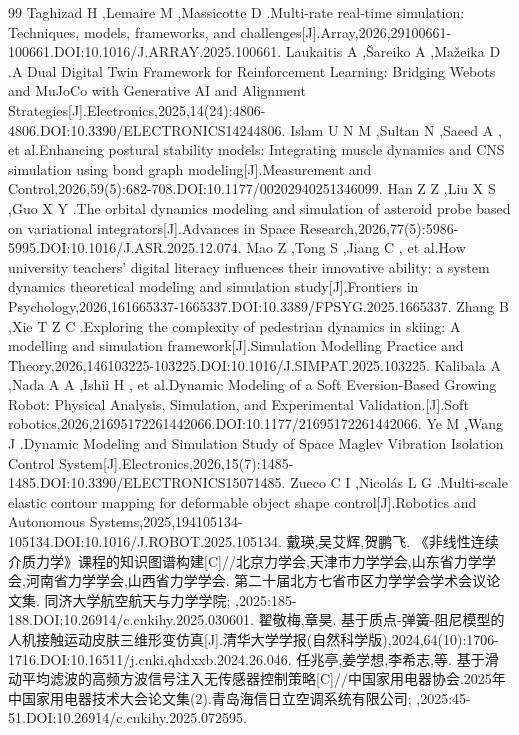\begin{thebibliography}{99}
 Taghizad H ,Lemaire M ,Massicotte D .Multi-rate real-time simulation: Techniques, models, frameworks, and challenges[J].Array,2026,29100661-100661.DOI:10.1016/J.ARRAY.2025.100661.
 Laukaitis A ,Šareiko A ,Mažeika D .A Dual Digital Twin Framework for Reinforcement Learning: Bridging Webots and MuJoCo with Generative AI and Alignment Strategies[J].Electronics,2025,14(24):4806-4806.DOI:10.3390/ELECTRONICS14244806.
 Islam U N M ,Sultan N ,Saeed A , et al.Enhancing postural stability models: Integrating muscle dynamics and CNS simulation using bond graph modeling[J].Measurement and Control,2026,59(5):682-708.DOI:10.1177/00202940251346099.
 Han Z Z ,Liu X S ,Guo X Y .The orbital dynamics modeling and simulation of asteroid probe based on variational integrators[J].Advances in Space Research,2026,77(5):5986-5995.DOI:10.1016/J.ASR.2025.12.074.
 Mao Z ,Tong S ,Jiang C , et al.How university teachers’ digital literacy influences their innovative ability: a system dynamics theoretical modeling and simulation study[J].Frontiers in Psychology,2026,161665337-1665337.DOI:10.3389/FPSYG.2025.1665337.
 Zhang B ,Xie T Z C .Exploring the complexity of pedestrian dynamics in skiing: A modelling and simulation framework[J].Simulation Modelling Practice and Theory,2026,146103225-103225.DOI:10.1016/J.SIMPAT.2025.103225.
 Kalibala A ,Nada A A ,Ishii H , et al.Dynamic Modeling of a Soft Eversion-Based Growing Robot: Physical Analysis, Simulation, and Experimental Validation.[J].Soft robotics,2026,21695172261442066.DOI:10.1177/21695172261442066.
 Ye M ,Wang J .Dynamic Modeling and Simulation Study of Space Maglev Vibration Isolation Control System[J].Electronics,2026,15(7):1485-1485.DOI:10.3390/ELECTRONICS15071485.
 Zueco C I ,Nicolás L G .Multi-scale elastic contour mapping for deformable object shape control[J].Robotics and Autonomous Systems,2025,194105134-105134.DOI:10.1016/J.ROBOT.2025.105134.
 戴瑛,吴艾辉,贺鹏飞. 《非线性连续介质力学》课程的知识图谱构建[C]//北京力学会,天津市力学学会,山东省力学学会,河南省力学学会,山西省力学学会. 第二十届北方七省市区力学学会学术会议论文集. 同济大学航空航天与力学学院; ,2025:185-188.DOI:10.26914/c.cnkihy.2025.030601.
 翟敬梅,章昊. 基于质点-弹簧-阻尼模型的人机接触运动皮肤三维形变仿真[J].清华大学学报(自然科学版),2024,64(10):1706-1716.DOI:10.16511/j.cnki.qhdxxb.2024.26.046.
 任兆亭,姜学想,李希志,等. 基于滑动平均滤波的高频方波信号注入无传感器控制策略[C]//中国家用电器协会.2025年中国家用电器技术大会论文集(2).青岛海信日立空调系统有限公司; ,2025:45-51.DOI:10.26914/c.cnkihy.2025.072595.

\end{thebibliography}
